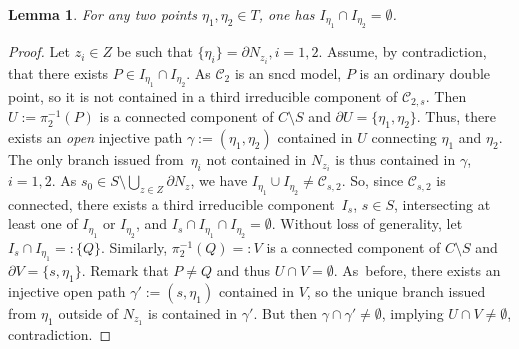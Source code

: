 \documentclass[10pt]{amsart}
\let\backslash\setminus
\newtheorem{lm}[thm]{Lemma}
\theoremstyle{definition}
\begin{document}
\begin{lm} \label{shtesa}
For any two points $\eta_1, \eta_2 \in T$, one has $I_{\eta_1} \cap I_{\eta_2}=\emptyset$.
\end{lm}

\begin{proof} Let $z_i \in Z$ be such that $\{\eta_i\}=\partial{N_{z_i}}, i=1,2$.
Assume, by contradiction, that there exists $P \in I_{\eta_1} \cap I_{\eta_2}$. As $\mathscr{C}_2$ is an sncd model, $P$ is an ordinary double point, so it is not contained in a third irreducible component of $\mathscr{C}_{2,s}$. Then $U:=\pi_2^{-1}(P)$ is a connected component of $C \backslash S$ and $\partial{U}=\{\eta_1, \eta_2\}$. Thus, there exists an \emph{open} injective path $\gamma:=(\eta_1, \eta_2)$ contained in $U$ connecting $\eta_1$ and $\eta_2$. The only branch issued from~$\eta_i$ not contained in $N_{z_i}$ is thus contained in $\gamma$, $i=1,2$. As $s_0 \in S \backslash \bigcup_{z \in Z} \partial{N_z}$, we have $I_{\eta_1} \cup I_{\eta_2} \neq \mathscr{C}_{s,2}$.
So, since $\mathscr{C}_{s,2}$ is connected, there exists a third irreducible component~$I_s$, $s\in S$, intersecting at least one of $I_{\eta_1}$ or $I_{\eta_2}$, and $I_s \cap I_{\eta_1} \cap I_{\eta_2}=\emptyset$. Without loss of generality, let $I_s \cap I_{\eta_1}=:\{Q\}$. Similarly, $\pi_2^{-1}(Q)=:V$ is a connected component of $C \backslash S$ and $\partial{V}=\{s, \eta_1\}$. Remark that $P \neq Q$ and thus $U \cap V=\emptyset$. As~before, there exists an injective open path $\gamma':=(s, \eta_1)$ contained in $V$, so the unique branch issued from $\eta_1$ outside of $N_{z_1}$ is contained in $\gamma'$. But then $\gamma \cap \gamma' \neq \emptyset$, implying $U \cap V \neq \emptyset$, contradiction.
\end{proof}
\end{document}
